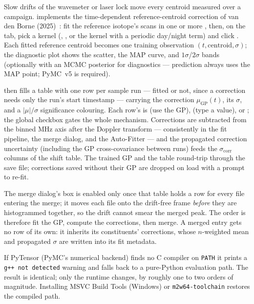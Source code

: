 Slow drifts of the wavemeter or laser lock move every centroid
measured over a campaign. \denis{} implements the time-dependent
reference-centroid correction of van den Borne
(2025)~\cite{vandenborne2025}: fit the reference isotope's scans in
one or more , then, on the
 tab, pick a kernel
(, , or the
 kernel with a periodic day/night term) and click
. Each fitted reference centroid becomes one training
observation $(t, \mathrm{centroid}, \sigma)$; the diagnostic plot
shows the scatter, the MAP curve, and $1\sigma$/$2\sigma$ bands
(optionally with an MCMC posterior for diagnostics --- prediction
always uses the MAP point; PyMC~v5 is required).

 then fills a table with one row
per sample run --- fitted or not, since a correction needs only the
run's start timestamp --- carrying the correction
$\mu_{\mathrm{GP}}(t)$, its
$\sigma$, and a $|\mu|/\sigma$ significance colouring. Each row's
 is  (use the GP),  (type a value),
or ; the global  checkbox
gates the whole mechanism. Corrections are subtracted from the
binned MHz axis after the Doppler transform --- consistently in the
fit pipeline, the merge dialog, and the Auto-Fitter --- and the
propagated correction uncertainty (including the GP cross-covariance
between runs) feeds the $\sigma_{\mathrm{corr}}$ columns of the
shift table. The trained GP and the table round-trip through the
save file; corrections saved without their GP are dropped on load
with a prompt to re-fit.

The merge dialog's  box is
enabled only once that table holds a row for every file entering the
merge; it moves each file onto the drift-free frame \emph{before}
they are histogrammed together, so the drift cannot smear the merged
peak. The order is therefore fit the GP, compute the corrections,
then merge. A merged entry gets no row of its own: it inherits its
constituents' corrections, whose $n$-weighted mean and propagated
$\sigma$ are written into its fit metadata.

If PyTensor (PyMC's numerical backend) finds no C compiler on
\texttt{PATH} it prints a \texttt{g++ not detected} warning and falls
back to a pure-Python evaluation path. The result is identical; only
the runtime changes, by roughly one to two orders of magnitude.
Installing MSVC Build Tools (Windows) or \texttt{m2w64-toolchain}
restores the compiled path.
